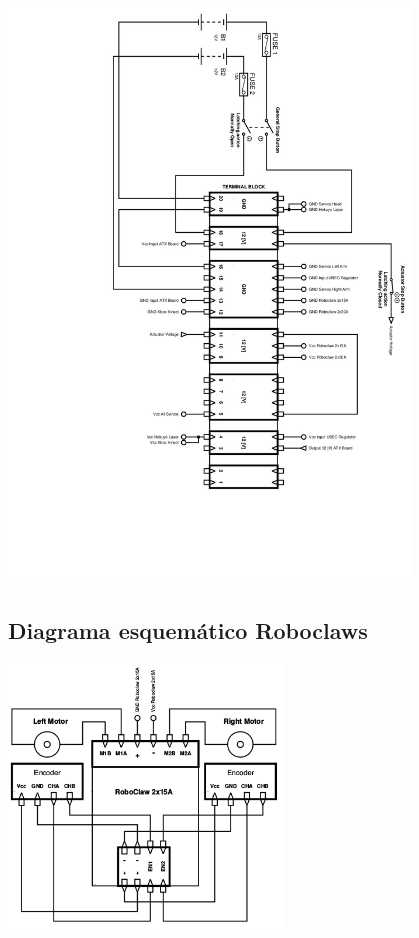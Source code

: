 \documentclass[user_manual.tex]{subfiles}
\begin{document}
\begin{center}
\includegraphics[width=0.8\textwidth]{Figures/Hardware/Esquematicos/JustinaWiringDiagram.jpg}
\label{fig:Hardware:Partes:Diagrama:Esquematico:General}
\end{center}

\subsection{Diagrama esquemático Roboclaws}

\begin{center}
\includegraphics[width=0.55\textwidth]{Figures/Hardware/Esquematicos/Roboclaw_1.png}
\label{fig:Hardware:Partes:Diagrama:Esquematico:Roboclaw:1}
\end{center}
\end{document}
